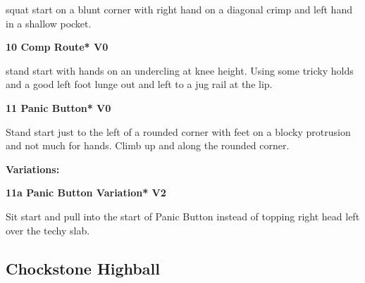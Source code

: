 \begin{multicols}{2}
\begin{minipage}{\linewidth}
					\begin{adjustwidth}{0.5cm}{}				
					squat start on a blunt corner with right hand on a diagonal crimp and left hand in a shallow pocket.
					\end{adjustwidth}
					\end{minipage}

					\begin{minipage}{\linewidth}	
					\label{rt:Comp Route}
\colorbox{green!20}{
\parbox{0.95\textwidth}{
\textbf{
10 Comp Route* V0   
}
}
}

					\begin{adjustwidth}{0.5cm}{}				
					stand start with hands on an undercling at knee height. Using some tricky holds and a good left foot lunge out and left to a jug rail at the lip.
					\end{adjustwidth}
					\end{minipage}
					\begin{minipage}{\linewidth}	
					\label{rt:Panic Button}
\colorbox{green!20}{
\parbox{0.95\textwidth}{
\textbf{
11 Panic Button* V0   
}
}
}

					\begin{adjustwidth}{0.5cm}{}				
					Stand start just to the left of a rounded corner with feet on a blocky protrusion and not much for hands. Climb up and along the rounded corner.
					\end{adjustwidth}
					\end{minipage}
						\begin{adjustwidth}{0.5cm}{}				
						\textbf{Variations:} \newline
							\begin{minipage}{\linewidth}	
							\label{vr:Panic Button Variation}
\colorbox{green!20}{
\parbox{0.95\textwidth}{
\textbf{
11a Panic Button Variation* V2    
}
}
}

							\begin{adjustwidth}{0.5cm}{}				
							Sit start and pull into the start of Panic Button instead of topping right head left over the techy slab.
							\end{adjustwidth}
							\end{minipage}
						\end{adjustwidth}
			\begin{minipage}{\columnwidth}
			\subsection*{Chockstone Highball}\label{bf:Chockstone Highball}
			\
			

\end{minipage}
\end{multicols}
